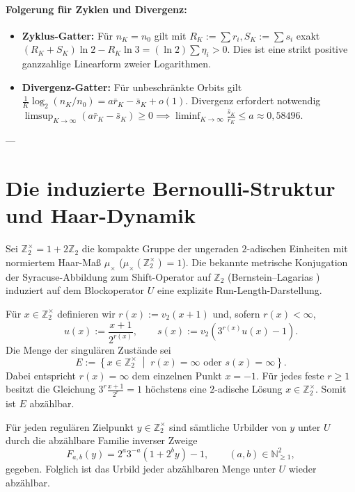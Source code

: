 \documentclass[11pt,reqno]{amsart}
\theoremstyle{definition}
\theoremstyle{remark}
\numberwithin{equation}{section}
\begin{document}
\paragraph{Folgerung f\"ur Zyklen und Divergenz:}
\begin{itemize}
\item \textbf{Zyklus-Gatter:} F\"ur $n_K = n_0$ gilt mit $R_K := \sum r_i, S_K := \sum s_i$ exakt $(R_K + S_K) \ln 2 - R_K \ln 3 = (\ln 2) \sum \eta_i > 0$. Dies ist eine strikt positive ganzzahlige Linearform zweier Logarithmen.
\item \textbf{Divergenz-Gatter:} F\"ur unbeschr\"ankte Orbits gilt $\frac{1}{K} \log_2(n_K/n_0) = a \bar{r}_K - \bar{s}_K + o(1)$. Divergenz erfordert notwendig $\limsup_{K \to \infty} (a \bar{r}_K - \bar{s}_K) \ge 0 \implies \liminf_{K \to \infty} \frac{\bar{s}_K}{\bar{r}_K} \le a \approx 0{,}58496$.
\end{itemize}

---

\section{Die induzierte Bernoulli-Struktur und Haar-Dynamik}

Sei $\mathbb{Z}_2^\times = 1 + 2\mathbb{Z}_2$ die kompakte Gruppe der ungeraden $2$-adischen Einheiten mit normiertem Haar-Ma\ss{} $\mu_\times$ ($\mu_\times(\mathbb{Z}_2^\times) = 1$). 
Die bekannte metrische Konjugation der Syracuse-Abbildung zum Shift-Operator auf $\mathbb{Z}_2$ (Bernstein--Lagarias \cite{BernsteinLagarias1996}) induziert auf dem Blockoperator $U$ eine explizite Run-Length-Darstellung.

F\"ur $x \in \mathbb{Z}_2^\times$ definieren wir $r(x) := v_2(x+1)$ und, sofern $r(x) < \infty$,
\begin{equation}
u(x) := \frac{x+1}{2^{r(x)}}, \qquad s(x) := v_2\left(3^{r(x)}u(x) - 1\right).
\end{equation}
Die Menge der singul\"aren Zust\"ande sei
\begin{equation}
E := \left\{ x \in \mathbb{Z}_2^\times \;\middle|\; r(x) = \infty \text{ oder } s(x) = \infty \right\}.
\end{equation}
Dabei entspricht $r(x) = \infty$ dem einzelnen Punkt $x = -1$. F\"ur jedes feste $r \ge 1$ besitzt die Gleichung $3^r \frac{x+1}{2^r} = 1$ h\"ochstens eine $2$-adische L\"osung $x \in \mathbb{Z}_2^\times$. Somit ist $E$ abz\"ahlbar.

F\"ur jeden regul\"aren Zielpunkt $y \in \mathbb{Z}_2^\times$ sind s\"amtliche Urbilder von $y$ unter $U$ durch die abz\"ahlbare Familie inverser Zweige
\begin{equation}
F_{a,b}(y) = 2^a 3^{-a}(1 + 2^b y) - 1, \qquad (a, b) \in \mathbb{N}_{\ge1}^2,
\end{equation}
gegeben. Folglich ist das Urbild jeder abz\"ahlbaren Menge unter $U$ wieder abz\"ahlbar.
\end{document}
